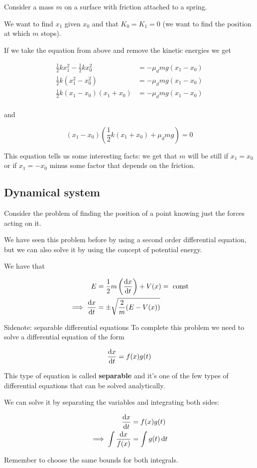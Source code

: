 \documentclass[10pt]{extarticle}
\begin{document}
Consider a mass $m$ on a surface with friction attached to a spring.

We want to find $x_1$ given $x_0$ and that $K_0 = K_1 = 0$ (we want to find the position at which $m$ stops).

If we take the equation from above and remove the kinetic energies we get

\begin{align*}
    \frac{1}{2} k x_1^2 - \frac{1}{2} k x_0^2 & = - \mu_d m g (x_1 - x_0) \\
    \frac{1}{2} k (x_1^2 - x_0^2)             & = - \mu_d m g (x_1 - x_0) \\
    \frac{1}{2} k (x_1 - x_0)(x_1 + x_0)      & = - \mu_d m g (x_1 - x_0) \\
\end{align*}

and

$$
    (x_1 - x_0) \left( \frac{1}{2} k (x_1 + x_0) + \mu_d m g \right) = 0
$$

This equation tells us some interesting facts:
we get that $m$ will be still if $x_1 = x_0$ or if $x_1 = -x_0$ minus some factor that depends on the friction.

\subsection{Dynamical system}

Consider the problem of finding the position of a point knowing just the forces acting on it.

We have seen this problem before by using a second order differential equation, but we can also solve it by using the concept of potential energy.

We have that

\begin{align*}
    E                  & = \frac{1}{2} m \left( \dv{x}{t} \right) + V(x) = \text{ const} \\
    \implies \dv{x}{t} & = \pm \sqrt{\frac{2}{m} (E - V(x))}
\end{align*}

\begin{bluebox}{Sidenote: separable differential equations}
    To complete this problem we need to solve a differential equation of the form

    $$
        \dv{x}{t} = f(x) g(t)
    $$

    This type of equation is called \textbf{separable} and it's one of the few types of differential equations that can be solved analytically.

    We can solve it by separating the variables and integrating both sides:

    \begin{align*}
        \dv{x}{t}                         & = f(x) g(t)        \\
        \implies \int \frac{\dd{x}}{f(x)} & = \int g(t) \dd{t}
    \end{align*}

    Remember to choose the same bounds for both integrals.
\end{bluebox}
\end{document}
